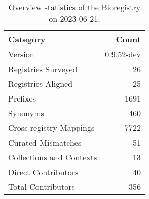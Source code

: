 \begin{table}
\caption{Overview statistics of the Bioregistry on 2023-06-21.}
\label{tab:bioregistry-summary}
\begin{tabular}{lr}
\toprule
Category & Count \\
\midrule
Version & 0.9.52-dev \\
Registries Surveyed & 26 \\
Registries Aligned & 25 \\
Prefixes & 1691 \\
Synonyms & 460 \\
Cross-registry Mappings & 7722 \\
Curated Mismatches & 51 \\
Collections and Contexts & 13 \\
Direct Contributors & 40 \\
Total Contributors & 356 \\
\bottomrule
\end{tabular}
\end{table}
